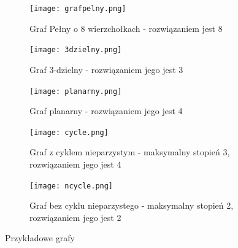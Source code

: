 \begin{figure}
    \begin{subfigure}[t]{0.4\textwidth}
      \texttt{[image: grafpelny.png]}
      \caption{Graf Pełny o 8 wierzchołkach - rozwiązaniem jest 8}
    \end{subfigure}
    \hfill
    \begin{subfigure}[t]{0.4\textwidth}
      \texttt{[image: 3dzielny.png]}
      \caption{Graf 3-dzielny - rozwiązaniem jego jest 3}
    \end{subfigure}
    \begin{subfigure}[t]{0.3\textwidth}
        \texttt{[image: planarny.png]}
        \caption{Graf planarny - rozwiązaniem jego jest 4}
    \end{subfigure}
    \hfill
    \begin{subfigure}[t]{0.3\textwidth}
        \texttt{[image: cycle.png]}
        \caption{Graf z cyklem nieparzystym - maksymalny stopień 3, rozwiązaniem jego jest 4}
    \end{subfigure}
    \hfill
    \begin{subfigure}[t]{0.3\textwidth}
        \texttt{[image: ncycle.png]}
        \caption{Graf bez cyklu nieparzystego - maksymalny stopień 2, rozwiązaniem jego jest 2}
    \end{subfigure}
    \caption{Przykładowe grafy}
    \label{Przyklady}
  \end{figure}

